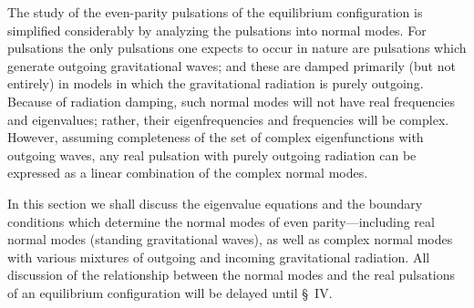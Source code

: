 The study of the even-parity pulsations of the equilibrium configuration is simplified
considerably by analyzing the pulsations into normal modes. For pulsations the only pulsations
one expects to occur in nature are pulsations which generate outgoing gravitational
waves; and these are damped primarily (but not entirely) in models in which the
gravitational radiation is purely outgoing. Because of radiation damping, such normal
modes will not have real frequencies and eigenvalues; rather, their eigenfrequencies
and frequencies will be complex. However, assuming completeness of the set of
complex eigenfunctions with outgoing waves, any real pulsation with purely outgoing
radiation can be expressed as a linear combination of the complex normal modes.

In this section we shall discuss the eigenvalue equations and the boundary conditions
which determine the normal modes of even parity---including real normal modes (standing
gravitational waves), as well as complex normal modes with various mixtures of
outgoing and incoming gravitational radiation. All discussion of the relationship between the normal modes and the real pulsations of an equilibrium configuration will
be delayed until \S~IV.
